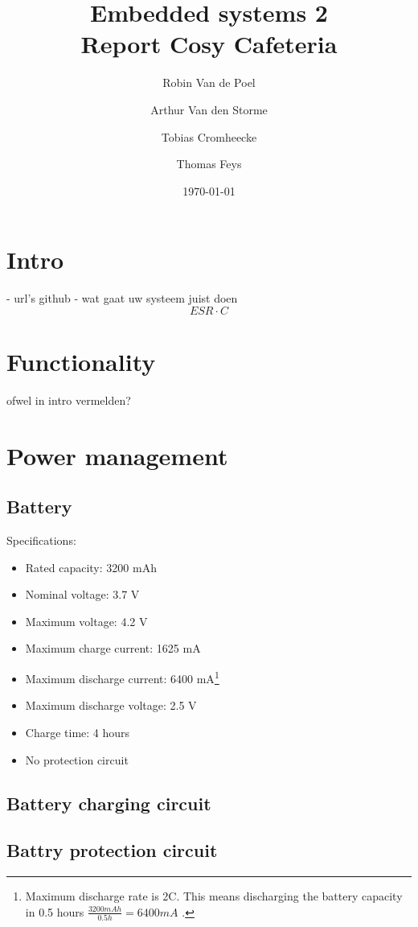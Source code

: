 \documentclass[11pt,a4paper]{article}
\begin{document}
\title{Embedded systems 2\\
	\Huge Report Cosy Cafeteria
}
\author{Robin Van de Poel\and Arthur Van den Storme\and Tobias Cromheecke\and Thomas Feys}
\date{\today}
\maketitle
\newpage

\tableofcontents
\newpage

\section{Intro}
- url's github
- wat gaat uw systeem juist doen
\[ ESR \cdot C \]
\section{Functionality}
ofwel in intro vermelden?

\section{Power management}
\subsection{Battery}
Specifications:
\begin{itemize}
	\item Rated capacity: 3200 mAh
	\item Nominal voltage: 3.7 V
	\item Maximum voltage: 4.2 V
	\item Maximum charge current: 1625 mA
	\item Maximum discharge current: 6400 mA\footnote{Maximum discharge rate is 2C. This means discharging the battery capacity in 0.5 hours $\frac{3200 mAh}{0.5 h} = 6400 mA$ .}
	\item Maximum discharge voltage: 2.5 V
	\item Charge time: 4 hours
	\item No protection circuit
\end{itemize}
\subsection{Battery charging circuit}
\subsection{Battry protection circuit}
\end{document}

